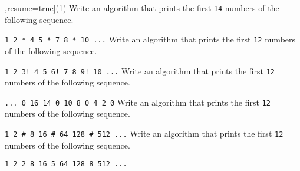 \begin{exercise}
    \begin{longtasks}[counter-format=7.tsk[1],resume=true](1)
        \task
        Write an algorithm that prints the first \texttt{14} numbers of the following sequence.

        \texttt{1 2 * 4 5 * 7 8 * 10 ...}
        \task
        Write an algorithm that prints the first \texttt{12} numbers of the following sequence.

        \texttt{1 2 3! 4 5 6! 7 8 9! 10 ...}
        \task
        Write an algorithm that prints the first \texttt{12} numbers of the following sequence.

        \texttt{... 0 16 14 0 10 8 0 4 2 0}
        \task
        Write an algorithm that prints the first \texttt{12} numbers of the following sequence.

        \texttt{1 2 \# 8 16 \# 64 128 \# 512 ...}
        \task
        Write an algorithm that prints the first \texttt{12} numbers of the following sequence.

        \texttt{1 2 2 8 16 5 64 128 8 512 ...}
    \end{longtasks}
\end{exercise}
